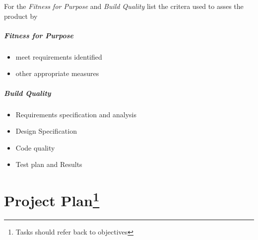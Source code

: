 For the \emph{Fitness for Purpose} and \emph{Build Quality}  list the critera used to asses the product by

\subparagraph{Fitness for Purpose}
\begin{itemize}
	\item meet requirements identified
	\item other appropriate measures
\end{itemize}

\subparagraph{Build Quality}
\begin{itemize}
	\item Requirements specification and analysis
	\item Design Specification
	\item Code quality
	\item Test plan and Results
\end{itemize}

\section{Project Plan\footnote{Tasks should refer back to objectives}}
\noindent
{}
